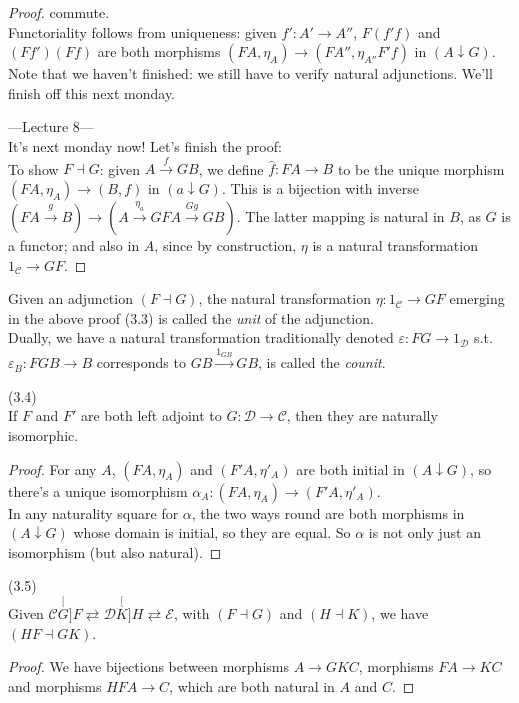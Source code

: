 \documentclass[a4paper]{article}
\begin{document}
\begin{thm}
\begin{proof}
        commute.\\
        Functoriality follows from uniqueness: given $f': A' \to A''$, $F(f'f)$ and $(Ff')(Ff)$ are both morphisms $(FA,\eta_A) \to (FA'',\eta_{A''}F'f)$ in $(A \downarrow G)$.\\
        Note that we haven't finished: we still have to verify natural adjunctions. We'll finish off this next monday. 

        ---Lecture 8---\\
        It's next monday now! Let's finish the proof:\\
        To show $F \dashv G$: given $A \xrightarrow{f} GB$, we define $\hat{f}:FA \to B$ to be the unique morphism $(FA,\eta_A) \to (B,f)$ in $(a \downarrow G)$. This is a bijection with inverse $(FA \xrightarrow{g} B) \to (A \xrightarrow{\eta_a} GFA \xrightarrow{Gg} GB)$. The latter mapping is natural in $B$, as $G$ is a functor; and also in $A$, since by construction, $\eta$ is a natural transformation $1_{\mathcal{C}} \to GF$.
    \end{proof}
\end{thm}

Given an adjunction $(F \dashv G)$, the natural transformation $\eta:1_{\mathcal{C}} \to GF$ emerging in the above proof (3.3) is called the \emph{unit} of the adjunction.\\
Dually, we have a natural transformation traditionally denoted $\varepsilon: FG \to 1_{\mathcal{D}}$ s.t. $\varepsilon_B:FGB \to B$ corresponds to $GB \xrightarrow{1_{GB}} GB$, is called the \emph{counit}.

\begin{coro} (3.4)\\
    If $F$ and $F'$ are both left adjoint to $G:\mathcal{D} \to \mathcal{C}$, then they are naturally isomorphic.
    \begin{proof}
        For any $A$, $(FA,\eta_A)$ and $(F'A,\eta'_A)$ are both initial in $(A\downarrow G)$, so there's a unique isomorphism $\alpha_A:(FA,\eta_A) \to (F'A,\eta'_A)$.\\
        In any naturality square for $\alpha$, the two ways round are both morphisms in $(A\downarrow G)$ whose domain is initial, so they are equal. So $\alpha$ is not only just an isomorphism (but also natural).
    \end{proof}
\end{coro}

\begin{lemma} (3.5)\\
    Given $\mathcal{C} \stackrel[G]{F}{\rightleftarrows} \mathcal{D} \stackrel[K]{H}{\rightleftarrows} \mathcal{E}$, with $(F \dashv G)$ and $(H \dashv K)$, we have $(HF \dashv GK)$.
    \begin{proof}
        We have bijections between morphisms $A \to GKC$, morphisms $FA \to KC$ and morphisms $HFA \to C$, which are both natural in $A$ and $C$.
    \end{proof}
\end{lemma}
\end{document}
